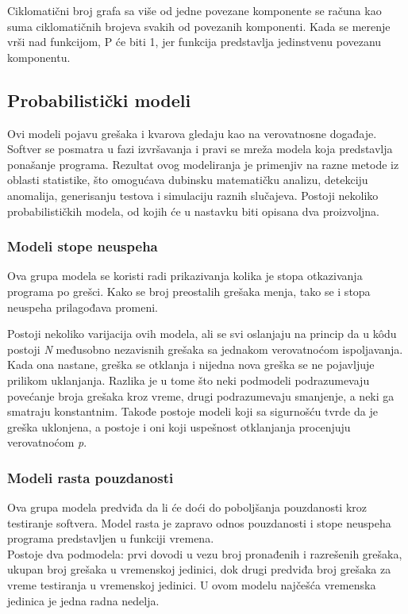 \documentclass[a4paper]{article}
\begin{document}
Ciklomatični broj grafa sa više od jedne povezane komponente se računa kao suma ciklomatičnih brojeva svakih od povezanih komponenti. Kada se merenje vrši nad funkcijom,  P će biti 1, jer funkcija predstavlja jedinstvenu povezanu komponentu.\\

\subsection{Probabilistički modeli}
\label{sec:probabilisticki}

Ovi modeli pojavu grešaka i kvarova gledaju kao na verovatnosne događaje. Softver se posmatra u fazi izvršavanja i pravi se mreža modela koja predstavlja ponašanje programa. Rezultat ovog modeliranja je primenjiv na razne metode iz oblasti statistike, što omogućava dubinsku matematičku analizu, detekciju anomalija, generisanju testova i simulaciju raznih slučajeva. Postoji nekoliko probabilističkih modela, od kojih će u nastavku biti opisana dva proizvoljna. \\

\subsubsection{Modeli stope neuspeha}
\label{subsec:stopa_neuspeha}

Ova grupa modela se koristi radi prikazivanja kolika je stopa otkazivanja programa po grešci. Kako se broj preostalih grešaka menja, tako se i stopa neuspeha prilagođava promeni.

Postoji nekoliko varijacija ovih modela, ali se svi oslanjaju na princip da u k\^{o}du postoji \textit{N} međusobno nezavisnih grešaka sa jednakom verovatnoćom ispoljavanja. Kada ona nastane, greška se otklanja i nijedna nova greška se ne pojavljuje prilikom uklanjanja.
Razlika je u tome što neki podmodeli podrazumevaju povećanje broja grešaka kroz vreme, drugi podrazumevaju smanjenje, a neki ga smatraju konstantnim. Takođe postoje modeli koji sa sigurnošću tvrde da je greška uklonjena, a postoje i oni koji uspešnost otklanjanja procenjuju verovatnoćom \textit{p}.

\subsubsection{Modeli rasta pouzdanosti}
\label{subsec:rast_pouzdanosti}

Ova grupa modela predviđa da li će doći do poboljšanja pouzdanosti kroz testiranje softvera. Model rasta je zapravo odnos pouzdanosti i stope neuspeha programa predstavljen u funkciji vremena.\\
Postoje dva podmodela: prvi dovodi u vezu broj pronađenih i razrešenih grešaka, ukupan broj grešaka u vremenskoj jedinici, dok drugi predviđa broj grešaka za vreme testiranja u vremenskoj jedinici. U ovom modelu najčešća vremenska jedinica je jedna radna nedelja.
\end{document}
